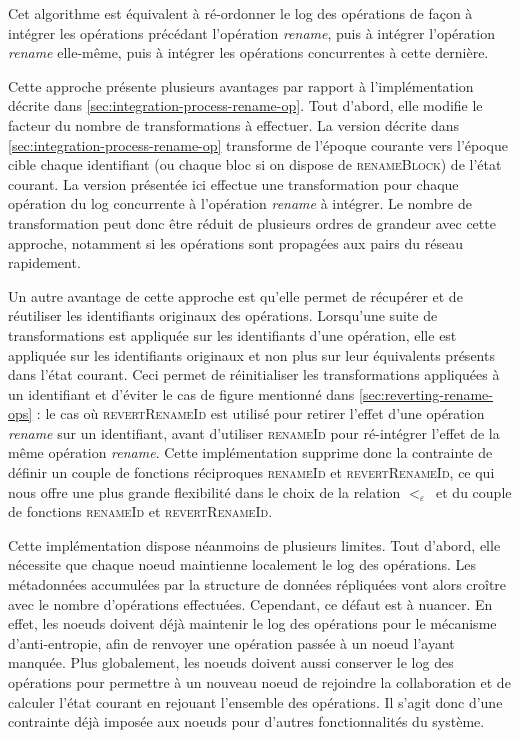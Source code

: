 \documentclass[12pt]{thesul}
\newcommand{\lepoch}{$<_{\varepsilon}$~}
\begin{document}
Cet algorithme est équivalent à ré-ordonner le log des opérations de façon à intégrer les opérations précédant l'opération \emph{rename}, puis à intégrer l'opération \emph{rename} elle-même, puis à intégrer les opérations concurrentes à cette dernière.

Cette approche présente plusieurs avantages par rapport à l'implémentation décrite dans \autoref{sec:integration-process-rename-op}.
Tout d'abord, elle modifie le facteur du nombre de transformations à effectuer.
La version décrite dans \autoref{sec:integration-process-rename-op} transforme de l'époque courante vers l'époque cible chaque identifiant (ou chaque bloc si on dispose de \textsc{renameBlock}) de l'état courant.
La version présentée ici effectue une transformation pour chaque opération du log concurrente à l'opération \emph{rename} à intégrer.
Le nombre de transformation peut donc être réduit de plusieurs ordres de grandeur avec cette approche, notamment si les opérations sont propagées aux pairs du réseau rapidement.

Un autre avantage de cette approche est qu'elle permet de récupérer et de réutiliser les identifiants originaux des opérations.
Lorsqu'une suite de transformations est appliquée sur les identifiants d'une opération, elle est appliquée sur les identifiants originaux et non plus sur leur équivalents présents dans l'état courant.
Ceci permet de réinitialiser les transformations appliquées à un identifiant et d'éviter le cas de figure mentionné dans \autoref{sec:reverting-rename-ops} : le cas où \textsc{revertRenameId} est utilisé pour retirer l'effet d'une opération \emph{rename} sur un identifiant, avant d'utiliser \textsc{renameId} pour ré-intégrer l'effet de la même opération \emph{rename}.
Cette implémentation supprime donc la contrainte de définir un couple de fonctions réciproques \textsc{renameId} et \textsc{revertRenameId}, ce qui nous offre une plus grande flexibilité dans le choix de la relation \lepoch et du couple de fonctions \textsc{renameId} et \textsc{revertRenameId}.

Cette implémentation dispose néanmoins de plusieurs limites.
Tout d'abord, elle nécessite que chaque noeud maintienne localement le log des opérations.
Les métadonnées accumulées par la structure de données répliquées vont alors croître avec le nombre d'opérations effectuées.
Cependant, ce défaut est à nuancer.
En effet, les noeuds doivent déjà maintenir le log des opérations pour le mécanisme d'anti-entropie, afin de renvoyer une opération passée à un noeud l'ayant manquée.
Plus globalement, les noeuds doivent aussi conserver le log des opérations pour permettre à un nouveau noeud de rejoindre la collaboration et de calculer l'état courant en rejouant l'ensemble des opérations.
Il s'agit donc d'une contrainte déjà imposée aux noeuds pour d'autres fonctionnalités du système.
\end{document}
